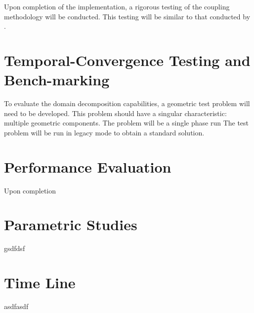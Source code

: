 Upon completion of the implementation, a rigorous testing of the coupling methodology will be conducted.
This testing will be similar to that conducted by \citet{Weaver2002}.

\section{Temporal-Convergence Testing and Bench-marking}
\label{sect:proposal_temporal_testing}
To evaluate the domain decomposition capabilities, a geometric test problem will need to be developed.
This problem should have a singular characteristic: multiple geometric components.
The problem will be a single phase run
The test problem will be run in legacy mode to obtain a standard solution.

\section{Performance Evaluation}
\label{sect:proposal_performance_evaluation}
Upon completion 

\section{Parametric Studies}
\label{sect:proposal_parametric_studies}
gsdfdsf

\section{Time Line}
\label{sect:proposal_time_line}
asdfasdf



